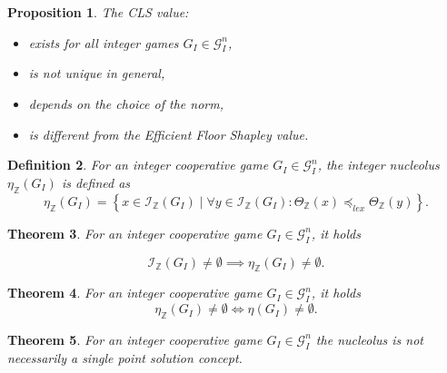 \documentclass[12pt]{report}
\newcounter{theorem}
\newtheorem{definition}[theorem]{Definition}
\newtheorem{theorem}{Theorem}
\newtheorem{proposition}[theorem]{Proposition}
\begin{document}
\begin{proposition}
    The CLS value:
    \begin{itemize}
        \item exists for all integer games $G_I \in \mathcal{G}_I^n$,
        \item is not unique in general,
        \item depends on the choice of the norm,
        \item is different from the Efficient Floor Shapley value.
    \end{itemize} 
\end{proposition}


\begin{definition}
    \label{def:integer_nucleolus}
    For an integer cooperative game $G_I \in \mathcal{G}_I^n$, the \emph{integer nucleolus} $\eta_\mathbb{Z}(G_I)$ is defined as
    \begin{displaymath}
        \eta_{\mathbb{Z}}(G_I) = \left\{ x \in \mathcal{I}_\mathbb{Z}(G_I) \mid \forall y \in \mathcal{I}_\mathbb{Z}(G_I): \Theta_\mathbb{Z}(x) \preceq_{lex} \Theta_\mathbb{Z}(y)\right\}.
    \end{displaymath}
\end{definition}

\begin{theorem}
    \label{thm:integer_nucleolus_existence}
    For an integer cooperative game $G_I \in \mathcal{G}_I^n$, it holds

    \begin{displaymath}
        \mathcal{I}_{\mathbb{Z}}(G_I) \neq \emptyset \implies \eta_\mathbb{Z}(G_I) \neq \emptyset.
    \end{displaymath}
\end{theorem}

\begin{theorem}\label{thm:integer_nucleolus_nonemptiness}
    For an integer cooperative game $G_I \in \mathcal{G}_I^n$, it holds
    \begin{displaymath}
        \eta_\mathbb{Z}(G_I) \neq \emptyset \iff \eta(G_I) \neq \emptyset.
    \end{displaymath}
\end{theorem}

\begin{theorem}
    \label{thm:integer_nucleolus_not_unique}
    For an integer cooperative game $G_I \in \mathcal{G}_I^n$ the nucleolus is not necessarily a single point solution concept.
\end{theorem}
\end{document}
